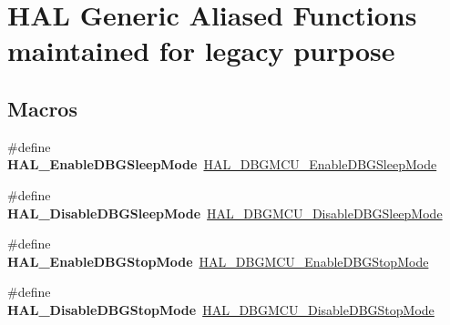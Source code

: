 \hypertarget{group___h_a_l___aliased___functions}{}\section{H\+AL Generic Aliased Functions maintained for legacy purpose}
\label{group___h_a_l___aliased___functions}
\subsection*{Macros}
\begin{DoxyCompactItemize}
\item 
\mbox{\label{group___h_a_l___aliased___functions_ga334dab724209d848427632878cd18590}} 
\#define {\bfseries H\+A\+L\+\_\+\+Enable\+D\+B\+G\+Sleep\+Mode}~\hyperlink{group___h_a_l___exported___functions___group2_gaf031bcc71ebad9b7edf405547efd762b}{H\+A\+L\+\_\+\+D\+B\+G\+M\+C\+U\+\_\+\+Enable\+D\+B\+G\+Sleep\+Mode}
\item 
\mbox{\label{group___h_a_l___aliased___functions_gadd190a639a43b5aa49cf3d773d6e877f}} 
\#define {\bfseries H\+A\+L\+\_\+\+Disable\+D\+B\+G\+Sleep\+Mode}~\hyperlink{group___h_a_l___exported___functions___group2_gac7820d0561f19999a68d714655b901b5}{H\+A\+L\+\_\+\+D\+B\+G\+M\+C\+U\+\_\+\+Disable\+D\+B\+G\+Sleep\+Mode}
\item 
\mbox{\label{group___h_a_l___aliased___functions_ga5d8db04085885e06f167cb9e901bb729}} 
\#define {\bfseries H\+A\+L\+\_\+\+Enable\+D\+B\+G\+Stop\+Mode}~\hyperlink{group___h_a_l___exported___functions___group2_gadf25043b17de4bef38a95a75fd03e5c4}{H\+A\+L\+\_\+\+D\+B\+G\+M\+C\+U\+\_\+\+Enable\+D\+B\+G\+Stop\+Mode}
\item 
\mbox{\label{group___h_a_l___aliased___functions_gaca227f80c71d94c0880bd681d68deb85}} 
\#define {\bfseries H\+A\+L\+\_\+\+Disable\+D\+B\+G\+Stop\+Mode}~\hyperlink{group___h_a_l___exported___functions___group2_ga2c93dcee35e5983d74f1000de7c042d5}{H\+A\+L\+\_\+\+D\+B\+G\+M\+C\+U\+\_\+\+Disable\+D\+B\+G\+Stop\+Mode}
\item 
\mbox{\label{group___h_a_l___aliased___functions_ga829fe0c92393d65bcb65eb8b8f7bdc99}} 

\end{DoxyCompactItemize}
